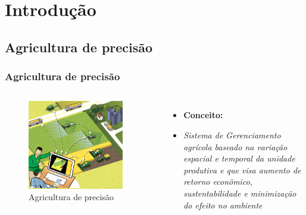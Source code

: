 \section{Introdução} %

\subsection{Agricultura de precisão}

\begin{frame}
\frametitle{Agricultura de precisão}
\begin{columns}

	\begin{figure}[]
	 \centering
	 \captionsetup{width=0.9\textwidth,font=footnotesize,textfont=bf}
	 \includegraphics[width=0.9\textwidth,keepaspectratio]{Figuras/precisao.jpg}
	 \caption{Agricultura de precisão}
	\end{figure}
	
	\begin{itemize}
	\item \textbf{Conceito:}
	\item \textit{Sistema de Gerenciamento agrícola baseado na variação espacial e temporal da unidade produtiva e que visa aumento de retorno econômico, sustentabilidade e minimização do efeito no ambiente}
	\end{itemize}

\end{columns}
\end{frame}

